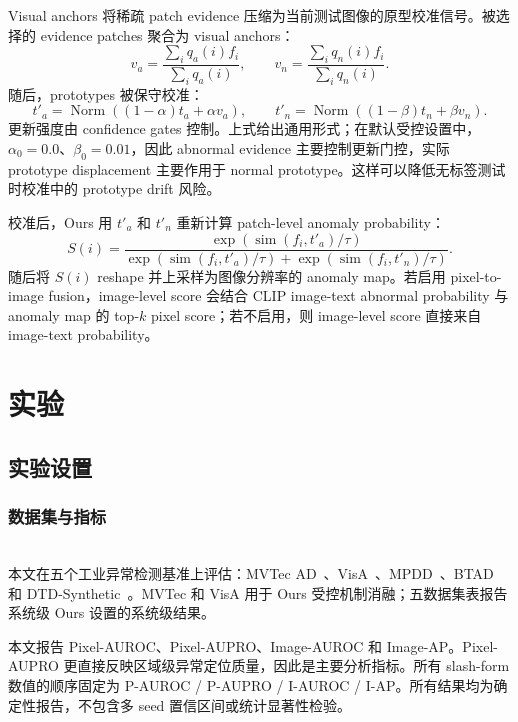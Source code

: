 \documentclass[runningheads]{llncs}
\newcommand{\simi}{\operatorname{sim}}
\begin{document}
Visual anchors 将稀疏 patch evidence 压缩为当前测试图像的原型校准信号。被选择的 evidence patches 聚合为 visual anchors：
\begin{equation}
v_a=\frac{\sum_i q_a(i)f_i}{\sum_i q_a(i)},\qquad
v_n=\frac{\sum_i q_n(i)f_i}{\sum_i q_n(i)}.
\end{equation}
随后，prototypes 被保守校准：
\begin{equation}
t'_a=\operatorname{Norm}\left((1-\alpha)t_a+\alpha v_a\right),\qquad
t'_n=\operatorname{Norm}\left((1-\beta)t_n+\beta v_n\right).
\end{equation}
更新强度由 confidence gates 控制。上式给出通用形式；在默认受控设置中，$\alpha_0=0.0$、$\beta_0=0.01$，因此 abnormal evidence 主要控制更新门控，实际 prototype displacement 主要作用于 normal prototype。这样可以降低无标签测试时校准中的 prototype drift 风险。

校准后，Ours 用 $t'_a$ 和 $t'_n$ 重新计算 patch-level anomaly probability：
\begin{equation}
S(i)=
\frac{\exp(\simi(f_i,t'_a)/\tau)}
{\exp(\simi(f_i,t'_a)/\tau)+\exp(\simi(f_i,t'_n)/\tau)} .
\end{equation}
随后将 $S(i)$ reshape 并上采样为图像分辨率的 anomaly map。若启用 pixel-to-image fusion，image-level score 会结合 CLIP image-text abnormal probability 与 anomaly map 的 top-$k$ pixel score；若不启用，则 image-level score 直接来自 image-text probability。

\section{实验}

\subsection{实验设置}

\subsubsection{数据集与指标}
\mbox{}\\
\noindent
本文在五个工业异常检测基准上评估：MVTec AD~\cite{bergmann2019mvtec,bergmann2021mvtec}、VisA~\cite{zou2022visa}、MPDD~\cite{jezek2021deep}、BTAD~\cite{mishra2021vt} 和 DTD-Synthetic~\cite{aota2023zero}。MVTec 和 VisA 用于 Ours 受控机制消融；五数据集表报告系统级 Ours 设置的系统级结果。

本文报告 Pixel-AUROC、Pixel-AUPRO、Image-AUROC 和 Image-AP。Pixel-AUPRO 更直接反映区域级异常定位质量，因此是主要分析指标。所有 slash-form 数值的顺序固定为 P-AUROC / P-AUPRO / I-AUROC / I-AP。所有结果均为确定性报告，不包含多 seed 置信区间或统计显著性检验。
\end{document}

